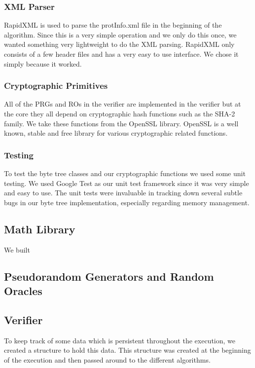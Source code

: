 \subsubsection{XML Parser}

RapidXML is used to parse the protInfo.xml file in the beginning of the algorithm. Since this is a very simple operation and we only do this once, we wanted something very lightweight to do the XML parsing. RapidXML only consists of a few header files and has a very easy to use interface. We chose it simply because it worked.

\subsubsection{Cryptographic Primitives}

All of the PRGs and ROs in the verifier are implemented in the verifier but at the core they all depend on cryptographic hash functions such as the SHA-2 family. We take these functions from the OpenSSL library. OpenSSL is a well known, stable and free library for various cryptographic related functions.

\subsubsection{Testing}

To test the byte tree classes and our cryptographic functions we used some unit testing. We used Google Test as our unit test framework since it was very simple and easy to use. The unit tests were invaluable in tracking down several subtle bugs in our byte tree implementation, especially regarding memory management.

\subsection{Math Library}

We built 

\subsection{Pseudorandom Generators and Random Oracles}


\subsection{Verifier}

To keep track of some data which is persistent throughout the execution, we created a structure to hold this data. This structure was created at the beginning of the execution and then passed around to the different algorithms.

